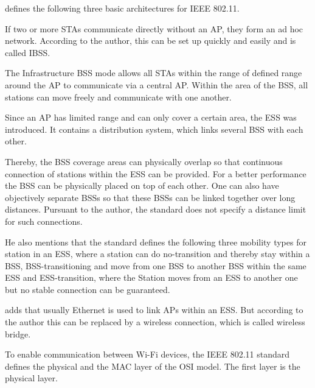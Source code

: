 \documentclass[]{nsm-thesis}
\begin{document}
\textcite{kauffels_wireless_2002} defines the following three basic architectures for IEEE 802.11.

If two or more \acp{STA} communicate directly without an \ac{AP}, they form an ad hoc network.
According to the author, this can be set up quickly and easily and is called \ac{IBSS}.

The Infrastructure \ac{BSS} mode allows all \ac{STA}s within the range of defined range around the \ac{AP} to communicate via a central \ac{AP}. Within the area of the \ac{BSS}, all stations can move freely and communicate with one another.

Since an \ac{AP} has limited range and can only cover a certain area, the \ac{ESS} was introduced.
It contains a distribution system, which links several \ac{BSS} with each other.

Thereby, the BSS coverage areas can physically overlap so that continuous connection of stations within the ESS can be provided.
For a better performance the \ac{BSS} can be physically placed on top of each other.
One can also have objectively separate \ac{BSS}s so that these \ac{BSS}s can be linked together over long distances.
Pursuant to the author, the standard does not specify a distance limit for such connections.

He also mentions that the standard defines the following three mobility types for station in an \ac{ESS}, where a station can do no-transition and thereby stay within a \ac{BSS}, \ac{BSS}-transitioning and move from one \ac{BSS} to another \ac{BSS} within the same \ac{ESS} and \ac{ESS}-transition, where the Station moves from an \ac{ESS} to another one but no stable connection can be guaranteed.

\textcite{sauter_wireless_2022} adds that usually Ethernet is used to link \ac{AP}s within an \ac{ESS}.
But according to the author this can be replaced by a wireless connection, which is called wireless bridge.

To enable communication between Wi-Fi devices, the IEEE 802.11 standard defines the physical and the MAC layer of the OSI model. The first layer is the physical layer.









%

\begin{comment}
	\section{Modell für drahtlose Übertragungssysteme}
Abb 2.3.1  Modell einen Übertragungssystems
Beschränkungen und Regelungen Frequenzwahl, Sendeleistung
Analoger Kanal Störungen: thermisches Rauschen, Nebensprechen, Impulsstörungen
\fi

\end{comment}
\end{document}
